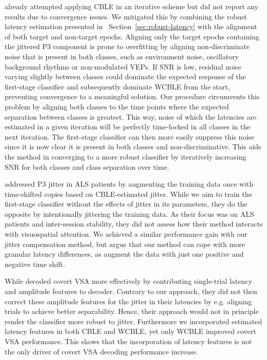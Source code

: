 \cite{Thompson2012} already attempted applying CBLE in an iterative scheme
but did not report any results due to convergence issues.
We mitigated this by combining the robust latency estimation presented in
~Section~\ref{sec:robust-latency} with the alignment of both target and non-target
epochs.
Aligning only the target epochs containing the jittered P3 component is prone to
overfitting by aligning non-discriminate noise that is present in both
classes, such as environment noise, oscillatory background rhythms or
non-modulated VEPs.
If SNR is low, residual noise varying slightly between classes could dominate
the expected response of the first-stage classifier and subsequently dominate
WCBLE from the start, preventing convergence to a meaningful solution.
Our procedure circumvents this problem by aligning both classes to the time
points where the expected separation between classes is greatest.
This way, noise of which the latencies are estimated in a given iteration will be
perfectly time-locked in all classes in the next
iteration.
The first-stage classifier can then more easily suppress this noise since it is
now clear it is present in both classes and non-discriminative.
This aids the method in converging to a more robust classifier by iteratively
increasing SNR for both classes and class separation over time.

\cite{Zisk2022} addressed P3 jitter in ALS patients by augmenting the training data once
with time-shifted copies based on CBLE-estimated jitter.
While we aim to train the first-stage classifier without the effects of jitter
in its parameters, they do the opposite by intentionally jittering the
training data.
As their focus was on ALS patients and inter-session stability, they
did not assess how their method interacts with visuospatial attention.
We achieved a similar performance gain with our jitter compensation method, but
argue that our method can cope with more granular latency differences, as
\cite{Zisk2022} augment the data with just one positive and negative time
shift.

While \cite{hardiansyah2020single} decoded covert VSA more effectively by
contributing single-trial latency and amplitude features to decoder.
Contrary to our approach, they did not then correct these amplitude
features for the jitter in their latencies by e.g. aligning trials to achieve
better separability.
Hence, their approach would not in principle render the classifier more robust
to jitter.
Furthermore we incorporated estimated latency features in both CBLE and WCBLE,
yet only WCBLE improved covert VSA performance.
This shows that the incorporation of latency features is not the only driver of
covert VSA decoding performance increase.

